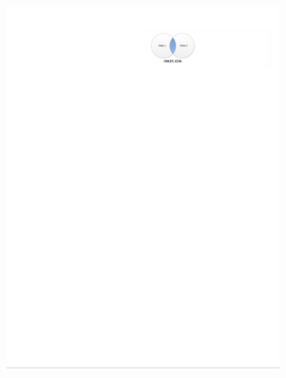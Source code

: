\begin{figure}[H]
\begin{subfigure}[c]{0.3\textwidth}
  \includegraphics[width=\textwidth]{figures/sql/inner_join}
  \label{fig:sql:joins:inner_join}
  \end{subfigure}
  ~
  \begin{subfigure}[c]{0.3\textwidth}\centering

\end{subfigure}
\end{figure}
